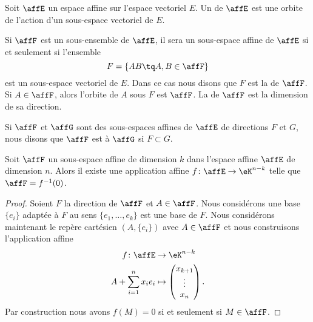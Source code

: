 \begin{definition}
    Soit \( \affE\) un espace affine sur l'espace vectoriel \( E\). Un  de \( \affE\) est une orbite de l'action d'un sous-espace vectoriel de \( E\).
\end{definition}

Si \( \affF\) est un sous-ensemble de \( \affE\), il sera un sous-espace affine de \( \affE\) si et seulement si l'ensemble
\begin{equation}
    F=\{ AB\tq A,B\in\affF \}
\end{equation}
est un sous-espace vectoriel de \( E\). Dans ce cas nous disons que \( F\) est la  de \( \affF\). Si \( A\in\affF\), alors l'orbite de \( A\) sous \( F\) est \( \affF\). La  de \( \affF\) est la dimension de sa direction.

Si \( \affF\) et \( \affG\) sont des sous-espaces affines de \( \affE\) de directions \( F\) et \( G\), nous disons que \( \affF\) est  à \( \affG\) si \( F\subset G\).

\begin{proposition}
    Soit \( \affF\) un sous-espace affine de dimension \( k\) dans l'espace affine \( \affE\) de dimension \( n\). Alors il existe une application affine \( f\colon \affE\to \eK^{n-k}\) telle que \( \affF=f^{-1}(0)\).
\end{proposition}

\begin{proof}
    Soient \( F\) la direction de \( \affF\) et \( A\in\affF\). Nous considérons une base \( \{ e_i \}\) adaptée à \( F\) au sens \( \{ e_1,\ldots, e_k \}\) est une base de \( F\). Nous considérons maintenant le repère cartésien \( (A,\{ e_i \})\) avec \( A\in\affF\) et nous construisons l'application affine
    \begin{equation}
        \begin{aligned}
            f\colon \affE&\to \eK^{n-k} \\
            A+\sum_{i=1}^nx_ie_i&\mapsto \begin{pmatrix}
                x_{k+1}    \\
                \vdots    \\
                x_n
            \end{pmatrix}.
        \end{aligned}
    \end{equation}
    Par construction nous avons \( f(M)=0\) si et seulement si \( M\in\affF\).
\end{proof}

